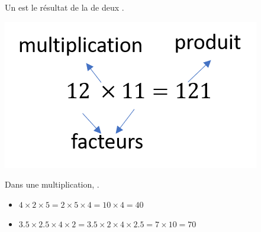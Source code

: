 \begin{mydef}
			Un  est le résultat de la  de deux .
		
\end{mydef}
	
\begin{myex}
	\begin{center}
		\includegraphics*[scale=0.7]{img/produit}
	\end{center}
\end{myex}

\begin{myprop}
	Dans une multiplication, .
\end{myprop}

\begin{myex}
	\begin{itemize}
		\item $4 \times 2 \times 5 = 2 \times 5 \times 4 = 10 \times 4 = 40$
		\item $\num{3.5} \times \num{2.5} \times 4 \times \num{2} = \num{3.5} \times \num{2} \times 4 \times \num{2.5} = 7 \times 10 = 70$
	\end{itemize}
\end{myex}